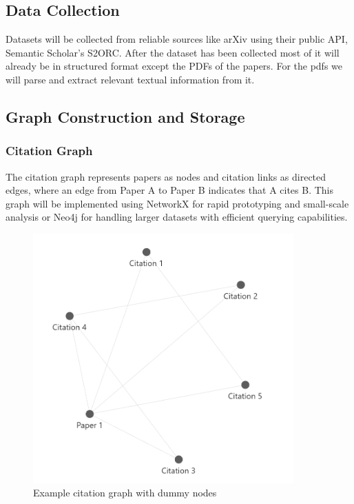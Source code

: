 \documentclass[a4paper,12pt]{article}
\begin{document}
\subsection{Data Collection}
Datasets will be collected from reliable sources like arXiv using their public API,
Semantic Scholar’s S2ORC. After the dataset has been collected most of it will
already be in structured format except the PDFs of the papers. For the pdfs we will
parse and extract relevant textual information from it.

\subsection{Graph Construction and Storage}
\subsubsection{Citation Graph}
The citation graph represents papers as nodes and citation links as directed edges,
where an edge from Paper A to Paper B indicates that A cites B. This graph will be
implemented using NetworkX for rapid prototyping and small-scale analysis or Neo4j
for handling larger datasets with efficient querying capabilities.
\begin{figure}[H]
    \centering
    \includegraphics[width=10cm]{citationgraph.png}
    \caption{Example citation graph with dummy nodes}
\end{figure}
\end{document}
